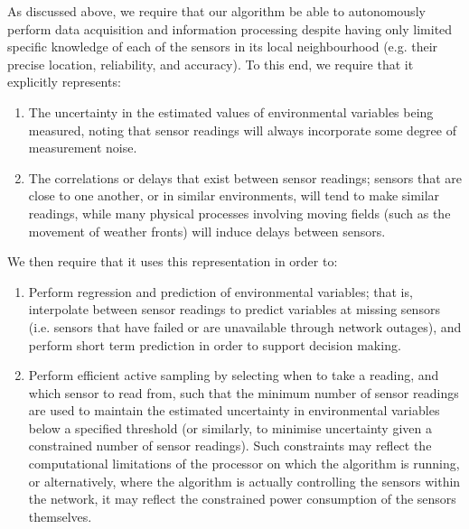 \documentclass{acmtrans2m}
\begin{document}
\noindent As discussed above, we require that our algorithm be able to autonomously perform data acquisition and information processing despite having only limited specific knowledge of each of the sensors in its local neighbourhood (e.g. their precise location, reliability, and accuracy). To this end, we require that it explicitly represents:
\begin{enumerate}
\item The uncertainty in the estimated values of environmental variables being measured, noting that sensor readings will always incorporate some degree of measurement noise.
\item The correlations or delays that exist between sensor readings; sensors that are close to one another, or in similar environments, will tend to make similar readings, while many physical processes involving moving fields (such as the movement of weather fronts) will induce delays between sensors.
\end{enumerate}
We then require that it uses this representation in order to:
\begin{enumerate}
\item Perform regression and prediction of environmental variables; that is, interpolate between sensor readings to predict variables at missing sensors (i.e. sensors that have failed or are unavailable through network outages), and perform short term prediction in order to support decision making.
\item Perform efficient active sampling by selecting when to take a reading, and which sensor to read from, such that the minimum number of sensor readings are used to maintain the estimated uncertainty in environmental variables below a specified threshold (or similarly, to minimise uncertainty given a constrained number of sensor readings). Such constraints may reflect the computational limitations of the processor on which the algorithm is running, or alternatively, where the algorithm is actually controlling the sensors within the network, it may reflect the constrained power consumption of the sensors themselves.
\end{enumerate}
\end{document}
